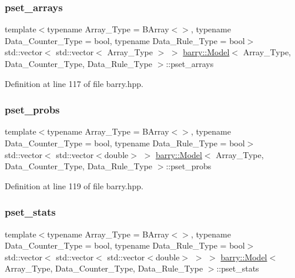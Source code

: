 \subsubsection{\texorpdfstring{pset\+\_\+arrays}{pset\_arrays}}
{\footnotesize\ttfamily template$<$typename Array\+\_\+\+Type  = B\+Array$<$$>$, typename Data\+\_\+\+Counter\+\_\+\+Type  = bool, typename Data\+\_\+\+Rule\+\_\+\+Type  = bool$>$ \\
std\+::vector$<$ std\+::vector$<$ Array\+\_\+\+Type $>$ $>$ \hyperlink{classbarry_1_1_model}{barry\+::\+Model}$<$ Array\+\_\+\+Type, Data\+\_\+\+Counter\+\_\+\+Type, Data\+\_\+\+Rule\+\_\+\+Type $>$\+::pset\+\_\+arrays}



Definition at line 117 of file barry.\+hpp.

\mbox{\label{classbarry_1_1_model_a4ccabb6842238fa5c7ff3476ef760423}} 
\subsubsection{\texorpdfstring{pset\+\_\+probs}{pset\_probs}}
{\footnotesize\ttfamily template$<$typename Array\+\_\+\+Type  = B\+Array$<$$>$, typename Data\+\_\+\+Counter\+\_\+\+Type  = bool, typename Data\+\_\+\+Rule\+\_\+\+Type  = bool$>$ \\
std\+::vector$<$ std\+::vector$<$double$>$ $>$ \hyperlink{classbarry_1_1_model}{barry\+::\+Model}$<$ Array\+\_\+\+Type, Data\+\_\+\+Counter\+\_\+\+Type, Data\+\_\+\+Rule\+\_\+\+Type $>$\+::pset\+\_\+probs}



Definition at line 119 of file barry.\+hpp.

\mbox{\label{classbarry_1_1_model_a3763f129965942611eb58e9779336f34}} 
\subsubsection{\texorpdfstring{pset\+\_\+stats}{pset\_stats}}
{\footnotesize\ttfamily template$<$typename Array\+\_\+\+Type  = B\+Array$<$$>$, typename Data\+\_\+\+Counter\+\_\+\+Type  = bool, typename Data\+\_\+\+Rule\+\_\+\+Type  = bool$>$ \\
std\+::vector$<$ std\+::vector$<$ std\+::vector$<$double$>$ $>$ $>$ \hyperlink{classbarry_1_1_model}{barry\+::\+Model}$<$ Array\+\_\+\+Type, Data\+\_\+\+Counter\+\_\+\+Type, Data\+\_\+\+Rule\+\_\+\+Type $>$\+::pset\+\_\+stats}



